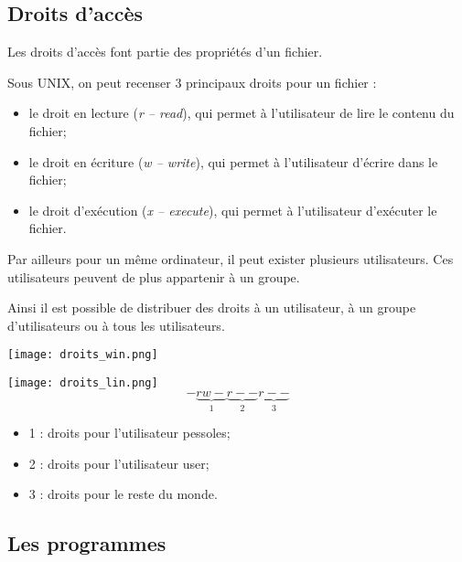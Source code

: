 \subsection{Droits d’accès}

Les droits d'accès font partie des propriétés d'un fichier. 

Sous UNIX, on peut recenser 3 principaux droits pour un fichier : 
\begin{itemize}
\item le droit en lecture (\textit{r -- read}), qui permet à l'utilisateur de lire le contenu du fichier;
\item le droit en écriture (\textit{w -- write}), qui permet à l'utilisateur d'écrire dans le fichier;
\item le droit d'exécution (\textit{x -- execute}), qui permet à l'utilisateur d'exécuter le fichier.
\end{itemize}

Par ailleurs pour un même ordinateur, il peut exister plusieurs utilisateurs. Ces utilisateurs peuvent de plus appartenir à un groupe.

Ainsi il est possible de distribuer des droits à un utilisateur, à un groupe d'utilisateurs ou à tous les utilisateurs.  

\begin{minipage}[c]{.45\linewidth}
\begin{center}
\texttt{[image: droits\_win.png]}
\end{center}
\end{minipage}\hfill
\begin{minipage}[c]{.45\linewidth}
\begin{center}
\texttt{[image: droits\_lin.png]}
$$
-\underbrace{rw-}_{1}\underbrace{r--}_{2}\underbrace{r--}_{3}
$$
\begin{itemize}
\item 1 : droits pour l'utilisateur pessoles;
\item 2 : droits pour l'utilisateur user;
\item 3 : droits pour le reste du monde.
\end{itemize}
\end{center}
\end{minipage}

\subsection{Les programmes}

